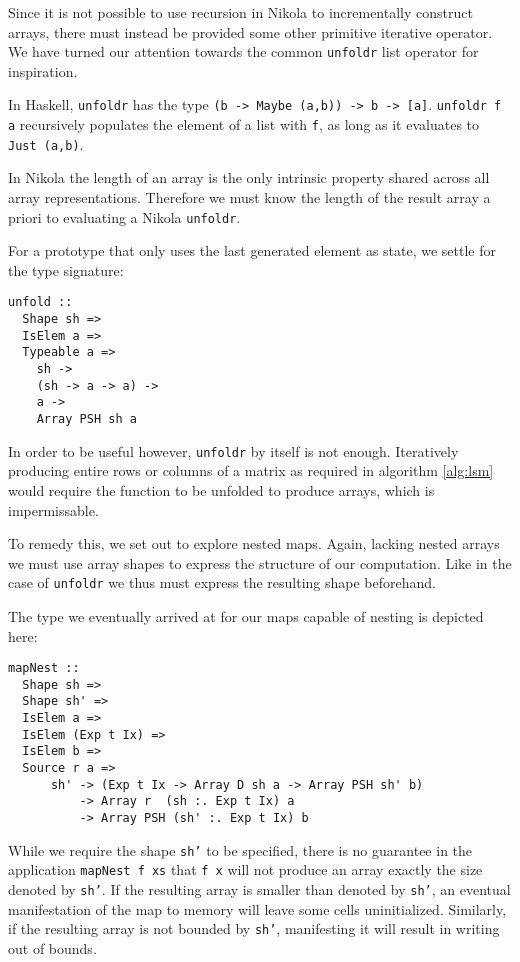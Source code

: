 Since it is not possible to use recursion in Nikola to incrementally construct
arrays, there must instead be provided some other primitive iterative operator.
We have turned our attention towards the common \texttt{unfoldr} list operator
for inspiration.

In Haskell, \texttt{unfoldr} has the type \texttt{(b -> Maybe (a,b)) -> b ->
[a]}.  \texttt{unfoldr f a} recursively populates the element of a list with
\texttt{f}, as long as it evaluates to \texttt{Just (a,b)}.

In Nikola the length of an array is the only intrinsic property shared across
all array representations. Therefore we must know the length of the result array a
priori to evaluating a Nikola \texttt{unfoldr}.

For a prototype that only uses the last generated element as state, we settle
for the type signature:
\begin{verbatim}
unfold ::
  Shape sh =>
  IsElem a =>
  Typeable a =>
    sh ->
    (sh -> a -> a) ->
    a ->
    Array PSH sh a
\end{verbatim}

In order to be useful however, \texttt{unfoldr} by itself is not enough.
Iteratively producing entire rows or columns of a matrix as required in
algorithm \ref{alg:lsm} would require the function to be unfolded to produce
arrays, which is impermissable.

To remedy this, we set out to explore nested maps. Again, lacking nested arrays
we must use array shapes to express the structure of our computation.  Like in
the case of \texttt{unfoldr} we thus must express the resulting shape beforehand.

The type we eventually arrived at for our maps capable of nesting is depicted
here:
\begin{verbatim}
mapNest ::
  Shape sh =>
  Shape sh' =>
  IsElem a =>
  IsElem (Exp t Ix) =>
  IsElem b =>
  Source r a =>
      sh' -> (Exp t Ix -> Array D sh a -> Array PSH sh' b)
          -> Array r  (sh :. Exp t Ix) a
          -> Array PSH (sh' :. Exp t Ix) b
\end{verbatim}

While we require the shape \texttt{sh'} to be specified, there is no guarantee
in the application \texttt{mapNest f xs} that \texttt{f x} will not produce an
array exactly the size denoted by \texttt{sh'}. If the resulting array is
smaller than denoted by \texttt{sh'}, an eventual manifestation of the map to
memory will leave some cells uninitialized. Similarly, if the resulting array
is not bounded by \texttt{sh'}, manifesting it will result in writing out of
bounds.

